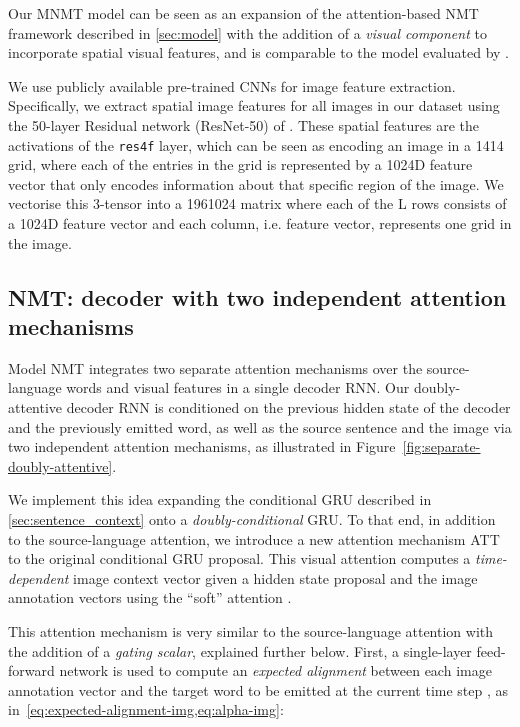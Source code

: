 \documentclass[11pt]{article}
\begin{document}
Our MNMT model can be seen as an expansion of the attention-based NMT framework described in \cref{sec:model} with the addition of a \emph{visual component} to incorporate spatial visual features, and is comparable to the model evaluated by .

We use publicly available pre-trained CNNs for image feature extraction.
Specifically, we extract spatial image features for all images in our dataset using the 50-layer Residual network (ResNet-50) of .
These spatial features are the activations of the \texttt{res4f} layer, which can be seen as encoding an image in a 1414 grid, where each of the entries in the grid is represented by a 1024D feature vector that only encodes information about that specific region of the image.
We vectorise this 3-tensor into a 1961024 matrix  where each of the L  rows consists of a 1024D feature vector and each column, i.e. feature vector, represents one grid in the image.



\subsection{\texorpdfstring{NMT}{}: decoder with two independent attention mechanisms}
\label{sec:model_2}


\begin{figure*}[ht!]\vspace{-10px}

\end{figure*}


Model NMT integrates two separate attention mechanisms over the source-language words and visual features in a single decoder RNN.
Our doubly-attentive decoder RNN is conditioned on the previous hidden state of the decoder and the previously emitted word, as well as the source sentence and the image via two independent attention mechanisms, as illustrated in Figure~\ref{fig:separate-doubly-attentive}.

We implement this idea expanding the conditional GRU described in \cref{sec:sentence_context} onto a \emph{doubly-conditional} GRU.
To that end, in addition to the source-language attention, we introduce a new attention mechanism ATT to the original conditional GRU proposal.
This visual attention computes a \emph{time-dependent} image context vector  given a hidden state proposal  and the image annotation vectors  using the ``soft'' attention \cite{Xuetal2015}.

This attention mechanism is very similar to the source-language attention with the addition of a \textit{gating scalar}, explained further below.
First, a single-layer feed-forward network is used to compute an \emph{expected alignment}  between each image annotation vector  and the target word to be emitted at the current time step , as in~\cref{eq:expected-alignment-img,eq:alpha-img}:
\end{document}
